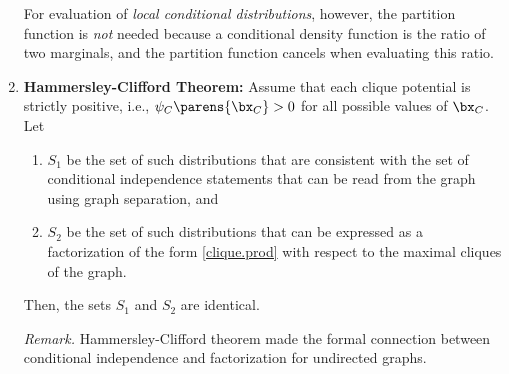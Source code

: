 \documentclass[12pt]{article}
\begin{document}
\begin{enumerate}[label=\textbf{\arabic*.}]
	For evaluation of \emph{local conditional distributions}, however, the partition function is \emph{not} needed because a conditional density function is the ratio of two marginals, and the partition function cancels when evaluating this ratio. 
		
	\item \textbf{Hammersley-Clifford Theorem:} Assume that each clique potential is strictly positive, i.e., $\psi_C \parens{\bx_C} > 0$ for all possible values of $\bx_C$. Let 
	\begin{enumerate}
		\item $S_1$ be the set of such distributions that are consistent with the set of conditional independence statements that can be read from the graph using graph separation, and 
		\item $S_2$ be the set of such distributions that can be expressed as a factorization of the form \eqref{clique.prod} with respect to the maximal cliques of the graph. 
	\end{enumerate}
	Then, the sets $S_1$ and $S_2$ are identical. 
	
	\textit{Remark.} Hammersley-Clifford theorem made the formal connection between conditional independence and factorization for undirected graphs. 
	

\end{enumerate}
\end{document}
